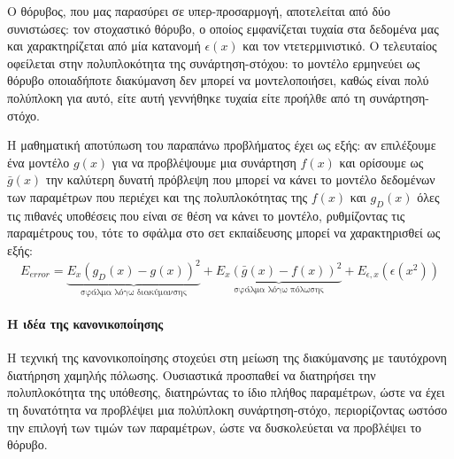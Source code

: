 Ο θόρυβος, που μας παρασύρει σε υπερ-προσαρμογή, αποτελείται από δύο συνιστώσες: τον στοχαστικό θόρυβο, ο οποίος εμφανίζεται τυχαία στα δεδομένα μας και χαρακτηρίζεται από μία κατανομή $\epsilon(x)$ και τον ντετερμινιστικό. Ο τελευταίος οφείλεται στην πολυπλοκότητα της συνάρτηση-στόχου: το μοντέλο ερμηνεύει ως θόρυβο οποιαδήποτε διακύμανση δεν μπορεί να μοντελοποιήσει, καθώς είναι πολύ πολύπλοκη για αυτό, είτε αυτή γεννήθηκε τυχαία είτε προήλθε από τη συνάρτηση-στόχο.

Η μαθηματική αποτύπωση του παραπάνω προβλήματος έχει ως εξής: αν επιλέξουμε ένα μοντέλο $g(x)$ για να προβλέψουμε μια συνάρτηση $f(x)$ και ορίσουμε ως $\bar{g}(x)$ την καλύτερη δυνατή πρόβλεψη που μπορεί να κάνει το μοντέλο δεδομένων των παραμέτρων που περιέχει και της πολυπλοκότητας της $f(x)$ και $g_D(x)$ όλες τις πιθανές υποθέσεις που είναι σε θέση να κάνει το μοντέλο, ρυθμίζοντας τις παραμέτρους του, τότε το σφάλμα στο σετ εκπαίδευσης μπορεί να χαρακτηρισθεί ως εξής:
	\begin{equation}
	E_{error}=\underbrace{E_x(g_D(x) - g(x))^2}_{\text{σφάλμα λόγω  διακύμανσης}} + \underbrace{E_x(\bar{g}(x)- f(x))^2}_{\text{σφάλμα λόγω πόλωσης}} + E_{\epsilon,x}(\epsilon(x^2))
	\end{equation}
\paragraph{Η ιδέα της κανονικοποίησης} Η τεχνική της κανονικοποίησης στοχεύει στη μείωση της διακύμανσης με ταυτόχρονη διατήρηση χαμηλής πόλωσης. Ουσιαστικά προσπαθεί να διατηρήσει την πολυπλοκότητα της υπόθεσης, διατηρώντας το
ίδιο πλήθος παραμέτρων, ώστε να έχει τη δυνατότητα να προβλέψει μια πολύπλοκη συνάρτηση-στόχο, περιορίζοντας ωστόσο την επιλογή των τιμών των παραμέτρων, ώστε να δυσκολεύεται να προβλέψει το θόρυβο.


